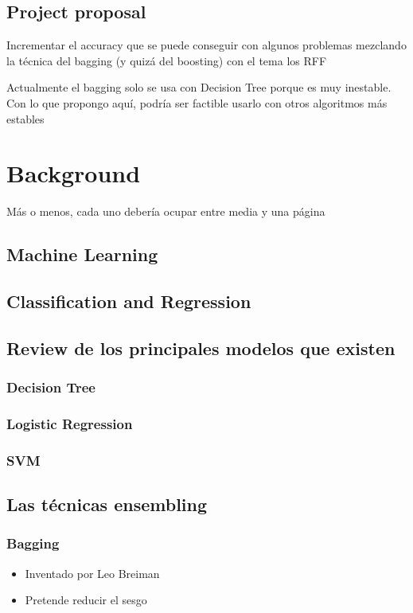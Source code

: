 \documentclass{article}
\begin{document}
    \subsection{Project proposal}
Incrementar el accuracy que se puede conseguir con algunos problemas mezclando
la técnica del bagging (y quizá del boosting) con el tema los RFF

Actualmente el bagging solo se usa con Decision Tree porque es muy inestable.
Con lo que propongo aquí, podría ser factible usarlo con otros algoritmos más
estables

\section{Background}
Más o menos, cada uno debería ocupar entre media y una página
    \subsection{Machine Learning}
    \subsection{Classification and Regression}
    \subsection{Review de los principales modelos que existen}
        \subsubsection{Decision Tree}
        \subsubsection{Logistic Regression}
        \subsubsection{SVM}
    \subsection{Las técnicas ensembling}
        \subsubsection{Bagging}
\begin{itemize}
    \item Inventado por Leo Breiman
    \item Pretende reducir el sesgo
\end{itemize}
\end{document}
